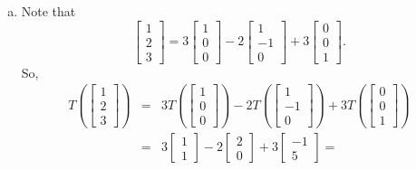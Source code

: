 \vspace{2mm}
\begin{enumerate}[a)]
	\item Note that
$$
\left[\begin{array}{c}1\\2\\3\end{array}\right] = 
3\left[\begin{array}{c}1\\0\\0\end{array}\right]
-2\left[\begin{array}{c}1\\-1\\0\end{array}\right]
+3\left[\begin{array}{c}0\\0\\1\end{array}\right].
$$
So,
\begin{eqnarray*}
T\left(\left[\begin{array}{c}1\\2\\3\end{array}\right]\right) &=&
3T\left(\left[\begin{array}{c}1\\0\\0\end{array}\right]\right)
-2T\left(\left[\begin{array}{c}1\\-1\\0\end{array}\right]\right)
+3T\left(\left[\begin{array}{c}0\\0\\1\end{array}\right]\right)\\
&=& 3\left[\begin{array}{c}1\\1\end{array}\right]
-2\left[\begin{array}{c}2\\0\end{array}\right]
+3\left[\begin{array}{c}-1\\5\end{array}\right] =

\end{eqnarray*}
\end{enumerate}
